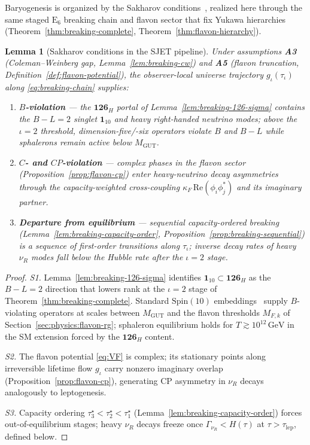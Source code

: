 \documentclass[11pt]{article}
\theoremstyle{plain}
\newtheorem{lemma}[theorem]{Lemma}
\theoremstyle{definition}
\theoremstyle{remark}
\numberwithin{equation}{section}
\newcommand{\E}[1]{\mathrm{E}_{#1}}
\newcommand{\Spin}{\mathrm{Spin}}
\begin{document}
Baryogenesis is organized by the Sakharov conditions~\cite{Sakharov1967},
realized here through the same staged $\E{6}$ breaking chain and flavon sector
that fix Yukawa hierarchies (Theorem~\ref{thm:breaking-complete},
Theorem~\ref{thm:flavon-hierarchy}).

\begin{lemma}[Sakharov conditions in the SJET pipeline]
\label{lem:sakharov-conditions}
Under assumptions \textbf{A3} (Coleman--Weinberg gap,
Lemma~\ref{lem:breaking-cw}) and \textbf{A5} (flavon truncation,
Definition~\ref{def:flavon-potential}), the observer-local universe
trajectory $g_\iota(\tau_\iota)$ along \eqref{eq:breaking-chain} supplies:
\begin{enumerate}[label=\textbf{S\arabic* :},leftmargin=*]
  \item \label{sak:b} \textbf{$B$-violation} --- the $\mathbf{126}_H$ portal of
    Lemma~\ref{lem:breaking-126-sigma} contains the $B\!-\!L=2$ singlet
    $\mathbf{1}_{10}$ and heavy right-handed neutrino modes; above the
    $\iota=2$ threshold, dimension-five/-six operators violate $B$ and
    $B\!-\!L$ while sphalerons remain active below $M_{\mathrm{GUT}}$.
  \item \label{sak:cp} \textbf{$C$- and $CP$-violation} --- complex phases in
    the flavon sector (Proposition~\ref{prop:flavon-cp}) enter heavy-neutrino
    decay asymmetries through the capacity-weighted cross-coupling
    $\kappa_F\,\mathrm{Re}(\phi_i\phi_j^*)$ and its imaginary partner.
  \item \label{sak:neq} \textbf{Departure from equilibrium} --- sequential
    capacity-ordered breaking
    (Lemma~\ref{lem:breaking-capacity-order},
    Proposition~\ref{prop:breaking-sequential}) is a sequence of first-order
    transitions along $\tau_\iota$; inverse decay rates of heavy $\nu_R$ modes
    fall below the Hubble rate after the $\iota=2$ stage.
\end{enumerate}
\end{lemma}

\begin{proof}
\emph{S1.} Lemma~\ref{lem:breaking-126-sigma} identifies
$\mathbf{1}_{10}\subset\mathbf{126}_H$ as the $B\!-\!L=2$ direction that
lowers rank at the $\iota=2$ stage of Theorem~\ref{thm:breaking-complete}.
Standard $\Spin(10)$ embeddings~\cite{Witten1985,GeorgiGlashow1974} supply
$B$-violating operators at scales between $M_{\mathrm{GUT}}$ and the flavon
thresholds $M_{F,k}$ of Section~\ref{sec:physics:flavon-rg}; sphaleron
equilibrium holds for $T\gtrsim 10^{12}\,\mathrm{GeV}$ in the SM extension
forced by the $\mathbf{126}_H$ content.

\emph{S2.} The flavon potential \eqref{eq:VF} is complex; its stationary
points along irreversible lifetime flow $g_\iota$ carry nonzero imaginary
overlap (Proposition~\ref{prop:flavon-cp}), generating CP asymmetry in
$\nu_R$ decays analogously to leptogenesis.

\emph{S3.} Capacity ordering $\tau_3^\star<\tau_2^\star<\tau_1^\star$
(Lemma~\ref{lem:breaking-capacity-order}) forces out-of-equilibrium stages;
heavy $\nu_R$ decays freeze once $\Gamma_{\nu_R}<H(\tau)$ at
$\tau>\tau_{\mathrm{lep}}$, defined below.
\end{proof}
\end{document}
